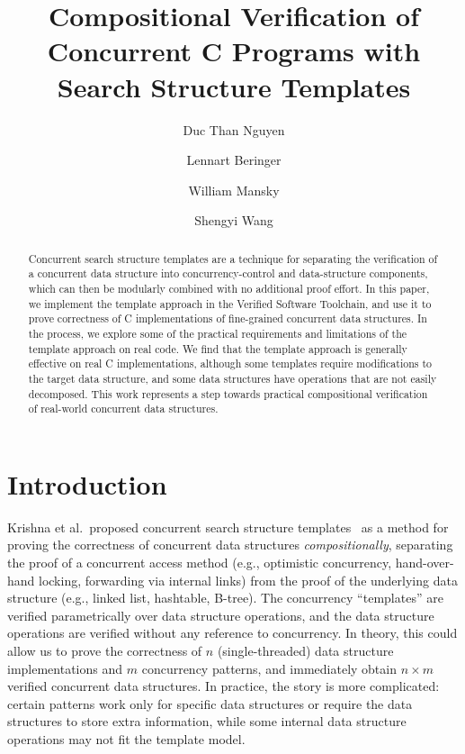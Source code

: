 \documentclass[a4paper,UKenglish,cleveref, autoref, thm-restate]{lipics-v2021}
\title{Compositional Verification of Concurrent C Programs with Search Structure Templates} %
\author{Duc Than Nguyen}{University of Illinois at Chicago, USA \and \url{http://dnguye96.people.uic.edu} }{dnguye96@uic.edu}{https://orcid.org/0000-0002-1825-0097}{(Optional) author-specific funding acknowledgements}%
\author{Lennart Beringer}{Princeton University, USA \and \url{https://www.cs.princeton.edu/~eberinge} }{eberinge@cs.princeton.edu}{https://orcid.org/0000-0002-1570-3492}{(Optional) author-specific funding acknowledgements}
\author{William Mansky}{University of Illinois at Chicago, USA\and \url{https://mansky.lab.uic.edu/} }{mansky1@uic.edu}{https://orcid.org/0000-0002-5351-895X}{(Optional) author-specific funding acknowledgements}
\author{Shengyi Wang}{Princeton University, USA \and \url{https://www.cs.princeton.edu/~shengyiw} }{shengyiw@cs.princeton.edu}{https://orcid.org/[0000-0002-2286-8703}{(Optional) author-specific funding acknowledgements}
\begin{document}
\maketitle

\begin{abstract}
Concurrent search structure templates are a technique for separating the verification of a concurrent data structure into concurrency-control and data-structure components, which can then be modularly combined with no additional proof effort. In this paper, we implement the template approach in the Verified Software Toolchain, and use it to prove correctness of C implementations of fine-grained concurrent data structures. In the process, we explore some of the practical requirements and limitations of the template approach on real code. %
We find that the template approach is generally effective on real C implementations, although some templates require modifications to the target data structure, and some data structures have operations that are not easily decomposed. This work represents a step towards practical compositional verification of real-world concurrent data structures.
\end{abstract}

\section{Introduction}
\label{sec:introduction}
Krishna et al.~proposed concurrent search structure templates~\cite{templates} as a method for proving the correctness of concurrent data structures \emph{compositionally}, separating the proof of a concurrent access method (e.g., optimistic concurrency, hand-over-hand locking, forwarding via internal links) from the proof of the underlying data structure (e.g., linked list, hashtable, B-tree). The concurrency ``templates'' are verified parametrically over data structure operations, and the data structure operations are verified without any reference to concurrency. In theory, this could allow us to prove the correctness of $n$ (single-threaded) data structure implementations and $m$ concurrency patterns, and immediately obtain $n \times m$ verified concurrent data structures. In practice, the story is more complicated: certain patterns work only for specific data structures or require the data structures to store extra information, while some internal data structure operations may not fit the template model. 
\end{document}
